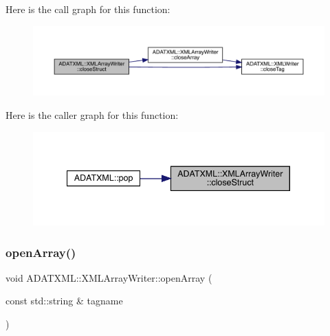 Here is the call graph for this function\+:\nopagebreak
\begin{figure}[H]
\begin{center}
\leavevmode
\includegraphics[width=350pt]{dc/df3/classADATXML_1_1XMLArrayWriter_a5a849f8851bce99654c44dc08b1fe486_cgraph}
\end{center}
\end{figure}
Here is the caller graph for this function\+:\nopagebreak
\begin{figure}[H]
\begin{center}
\leavevmode
\includegraphics[width=340pt]{dc/df3/classADATXML_1_1XMLArrayWriter_a5a849f8851bce99654c44dc08b1fe486_icgraph}
\end{center}
\end{figure}
\mbox{\label{classADATXML_1_1XMLArrayWriter_aae20d7fa7fe499da36f54ae08b64860e}} 
\subsubsection{\texorpdfstring{openArray()}{openArray()}\hspace{0.1cm}{\footnotesize\ttfamily [1/2]}}
{\footnotesize\ttfamily void A\+D\+A\+T\+X\+M\+L\+::\+X\+M\+L\+Array\+Writer\+::open\+Array (\begin{DoxyParamCaption}\item[{const std\+::string \&}]{tagname }\end{DoxyParamCaption})}

\mbox{\label{classADATXML_1_1XMLArrayWriter_aae20d7fa7fe499da36f54ae08b64860e}} 
